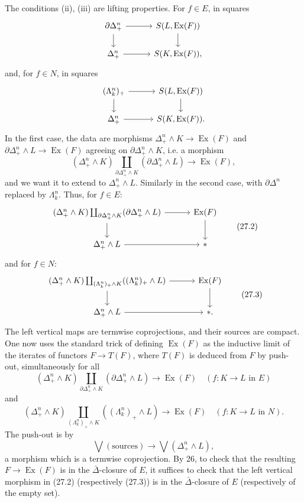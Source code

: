 \documentclass[11pt]{article}
\newcommand{\pt}{*}
\theoremstyle{deligne}
\newcommand{\Ex}{\operatorname{Ex}}
\begin{document}
The conditions (ii), (iii) are lifting properties. For \(f\in E\), in squares
\[
\begin{tikzcd}[column sep=3.0em,row sep=1.6em]
\partial\Delta^n_+ \arrow[r] \arrow[d] & S(L,\Ex(F)) \arrow[d] \\
\Delta^n_+ \arrow[r] & S(K,\Ex(F)),
\end{tikzcd}
\]
and, for \(f\in N\), in squares
\[
\begin{tikzcd}[column sep=3.0em,row sep=1.6em]
(\Lambda^n_k)_+ \arrow[r] \arrow[d] & S(L,\Ex(F)) \arrow[d] \\
\Delta^n_+ \arrow[r] & S(K,\Ex(F)).
\end{tikzcd}
\]
In the first case, the data are morphisms \(\Delta^n_+\wedge K\to\Ex(F)\) and \(\partial\Delta^n_+\wedge L\to\Ex(F)\) agreeing on \(\partial\Delta^n_+\wedge K\), i.e. a morphism
\[
(\Delta^n_+\wedge K)\coprod_{\partial\Delta^n_+\wedge K}(\partial\Delta^n_+\wedge L)\longrightarrow \Ex(F),
\]
and we want it to extend to \(\Delta^n_+\wedge L\). Similarly in the second case, with \(\partial\Delta^n\) replaced by \(\Lambda^n_k\). Thus, for \(f\in E\):
\[
\begin{tikzcd}[column sep=3.1em,row sep=1.8em]
(\Delta^n_+\wedge K)\coprod_{\partial\Delta^n_+\wedge K}(\partial\Delta^n_+\wedge L) \arrow[r] \arrow[d] & \Ex(F) \arrow[d] \\
\Delta^n_+\wedge L \arrow[r] & \pt
\end{tikzcd}
\tag{27.2}
\]
and for \(f\in N\):
\[
\begin{tikzcd}[column sep=3.1em,row sep=1.8em]
(\Delta^n_+\wedge K)\coprod_{(\Lambda^n_k)_+\wedge K}((\Lambda^n_k)_+\wedge L) \arrow[r] \arrow[d] & \Ex(F) \arrow[d] \\
\Delta^n_+\wedge L \arrow[r] & \pt .
\end{tikzcd}
\tag{27.3}
\]
The left vertical maps are termwise coprojections, and their sources are compact. One now uses the standard trick of defining \(\Ex(F)\) as the inductive limit of the iterates of functors \(F\to T(F)\), where \(T(F)\) is deduced from \(F\) by push-out, simultaneously for all
\[
(\Delta^n_+\wedge K)\coprod_{\partial\Delta^n_+\wedge K}(\partial\Delta^n_+\wedge L)\to \Ex(F)
\quad (f:K\to L\text{ in }E)
\]
and
\[
(\Delta^n_+\wedge K)\coprod_{(\Lambda^n_k)_+\wedge K}((\Lambda^n_k)_+\wedge L)\to \Ex(F)
\quad (f:K\to L\text{ in }N).
\]
The push-out is by
\[
\bigvee(\text{sources})\longrightarrow \bigvee(\Delta^n_+\wedge L),
\]
a morphism which is a termwise coprojection. By 26, to check that the resulting \(F\to\Ex(F)\) is in the \(\bar\Delta\)-closure of \(E\), it suffices to check that the left vertical morphism in (27.2) (respectively (27.3)) is in the \(\bar\Delta\)-closure of \(E\) (respectively of the empty set).
\end{document}
